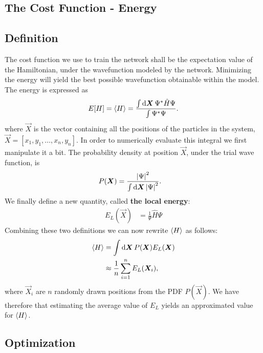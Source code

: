 \documentclass[a4paper, 11pt]{article}
\begin{document}
\begin{multicols}{2}
    \section{The Cost Function - Energy}
    \subsection{Definition}

    The cost function we use to train the network shall be the expectation value
    of the Hamiltonian, under the wavefunction modeled by the network.
    Minimizing the energy will yield the best possible wavefunction obtainable
    within the model. The energy is expressed as
    \begin{align}
        E[H] = \expval{H} = \frac{\int \dd{\bm X} \Psi^* \hat H \Psi}{\int
        \Psi^*\Psi}.
    \end{align}
    where $\vec X$ is the vector containing all the positions of the particles in
    the system, $\vec X = [x_1, y_1,\dots, x_n, y_n]$.
    In order to numerically evaluate this integral we first manipulate it a bit.
    The probability density at position $\vec X$, under the trial wave function, is
    \begin{align}
        P(\bm X) &= \frac{\abs{\Psi}^2}{\int \dd{\bm X}\abs{\Psi}^2}.
    \end{align}
    We finally define a new quantity, called \textbf{the local energy}:
    \begin{align}
        E_L(\vec X) &= \frac{1}{\Psi}\hat H\Psi\label{eq:E_L}
    \end{align}
    Combining these two definitions we can now rewrite $\expval{H}$ as follows:
    \begin{align}
        \begin{split}
            \expval{H} &= \int \dd{\bm X} P(\bm X) E_L(\bm X)\\
            &\approx
            \frac{1}{n}\sum_{i=1}^n E_L(\bm X_i),
        \end{split}\label{eq:the-objective}
    \end{align}
    where $\vec X_i$ are $n$ randomly drawn positions from the PDF $P(\vec X)$.
    We have therefore that estimating the average value of $E_L$ yields an
    approximated value for $\expval{H}$. 


    \subsection{Optimization}


\end{multicols}
\end{document}
